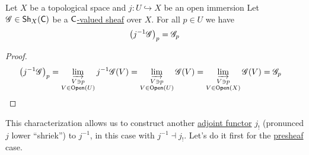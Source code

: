 \documentclass[../../main]{subfiles}
\begin{document}
\begin{lemma}\label{lemma:inverse-image-stalk-open-map}
  Let \(X\) be a topological space and \(j\colon U \hookrightarrow X\) be an open immersion
  Let \(\mathscr{G} \in \mathsf{Sh}_{X}(\mathsf{C})\) be a \hyperref[def:sheaf]{\(\mathsf{C}\)-valued sheaf} over \(X\).
  For all \(p \in U\) we have
  \begin{equation*}
    \left( j^{-1}\mathscr{G} \right)_{p} = \mathscr{G}_{p}
  \end{equation*}
\end{lemma}
\begin{proof}
  \begin{align*}
    \left( j^{-1}\mathscr{G} \right)_{p} &= \varinjlim_{\substack{V \ni p \\ V \in \mathsf{Open}(U)}} j^{-1}\mathscr{G}(V) = \varinjlim_{\substack{V \ni p \\ V \in \mathsf{Open}(U)}} \mathscr{G}(V) = \varinjlim_{\substack{V \ni p \\ V \in \mathsf{Open}(X)}} \mathscr{G}(V) = \mathscr{G}_{p} \qedhere
  \end{align*}
\end{proof}

This characterization allows us to construct another \hyperref[def:adjoint-functors]{adjoint functor} \(j_{!}\) (pronunced \(j\) lower ``shriek'') to \(j^{-1}\), in this case with \(j^{-1} \dashv j_{!}\).
Let's do it first for the \hyperref[def:presheaf]{presheaf} case.
\end{document}
